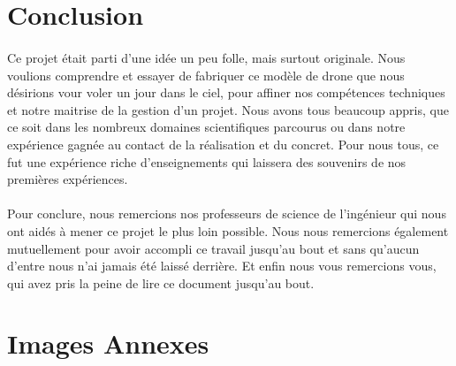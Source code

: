 \documentclass[a4paper,11pt]{article}
\begin{document}
\newpage

\section{Conclusion}

\paragraph{}Ce projet était parti d'une idée un peu folle, mais surtout originale. Nous voulions comprendre et essayer de fabriquer ce modèle de drone que nous désirions vour voler un jour dans le ciel, pour affiner nos compétences techniques et notre maitrise de la gestion d'un projet. Nous avons tous beaucoup appris, que ce soit dans les nombreux domaines scientifiques parcourus ou dans notre expérience gagnée au contact de la réalisation et du concret. Pour nous tous, ce fut une expérience riche d'enseignements qui laissera des souvenirs de nos premières expériences.\\

\paragraph{}Pour conclure, nous remercions nos professeurs de science de l'ingénieur qui nous ont aidés à mener ce projet le plus loin possible. Nous nous remercions également mutuellement pour avoir accompli ce travail jusqu'au bout et sans qu'aucun d'entre nous n'ai jamais été laissé derrière. Et enfin nous vous remercions vous, qui avez pris la peine de lire ce document jusqu'au bout.

\newpage

\section{Images Annexes}
\end{document}
